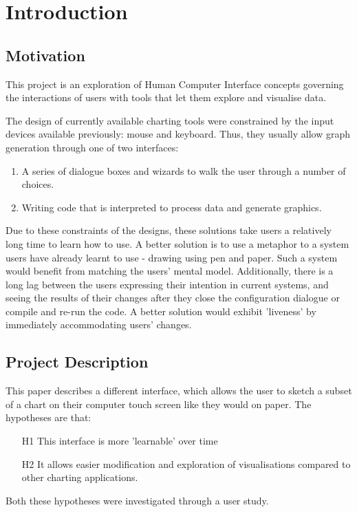 \chapter{Introduction}
\section{Motivation}
This project is an exploration of Human Computer Interface concepts governing the interactions of users with tools that let them explore and visualise data.

The design of currently available charting tools were constrained by the input devices available previously: mouse and keyboard. Thus, they usually allow graph generation through one of two interfaces:
\begin{enumerate}
\item A series of dialogue boxes and wizards to walk the user through a number of choices.
\item Writing code that is interpreted to process data and generate graphics.
\end{enumerate}

Due to these constraints of the designs, these solutions take users a relatively long time to learn how to use. A better solution is to use a metaphor to a system users have already learnt to use - drawing using pen and paper. Such a system would benefit from matching the users' mental model. Additionally, there is a long lag between the users expressing their intention in current systems, and seeing the results of their changes after they close the configuration dialogue or compile and re-run the code. A better solution would exhibit 'liveness' by immediately accommodating users' changes.

\section{Project Description}
This paper describes a different interface, which allows the user to sketch a subset of a chart on their computer touch screen like they would on paper. The hypotheses are that:
\begin{enumerate}
\item[H1] This interface is more 'learnable' over time
\item[H2] It allows easier modification and exploration of visualisations compared to other charting applications.
\end{enumerate}

Both these hypotheses were investigated through a user study.

